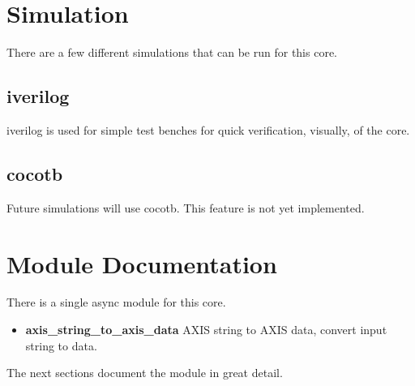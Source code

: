 \newpage

\section{Simulation}
\par
There are a few different simulations that can be run for this core.

\subsection{iverilog}
\par
iverilog is used for simple test benches for quick verification, visually, of the core.

\subsection{cocotb}
\par
Future simulations will use cocotb. This feature is not yet implemented.

\newpage

\section{Module Documentation} \label{Module Documentation}

\par
There is a single async module for this core.

\begin{itemize}
\item \textbf{axis\_string\_to\_axis\_data} AXIS string to AXIS data, convert input string to data.\\
\end{itemize}
The next sections document the module in great detail.

